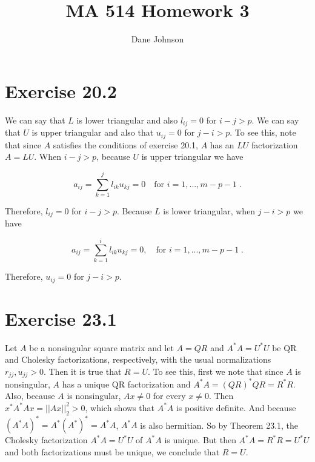 \documentclass[11pt]{article}
\title{MA 514 Homework 3}
\author{Dane Johnson}
\begin{document}
\maketitle

\section*{Exercise 20.2}

We can say that $L$ is lower triangular and also $l_{ij} = 0$ for $i-j > p$. We can say that $U$ is upper triangular and also that $u_{ij} = 0$ for $j-i > p$. To see this, note that since $A$ satisfies the conditions of exercise 20.1, $A$ has an $LU$ factorization $A = LU$. When $i-j>p$, because $U$ is upper triangular we have

$$a_{ij} = \sum_{k=1}^j l_{ik}u_{kj}  = 0 \quad \text{for } i = 1,...,m-p-1 \;.$$

Therefore, $l_{ij} = 0$ for $i-j > p$. Because $L$ is lower triangular, when $j-i > p$ we have

$$a_{ij} = \sum_{k=1}^i l_{ik}u_{kj} = 0, \quad \text{for } i = 1,...,m-p-1 \;.$$

Therefore, $u_{ij} = 0$ for $j-i > p$.

\section*{Exercise 23.1}

Let $A$ be a nonsingular square matrix and let $A = QR$ and $A^*A = U^*U$ be QR and Cholesky factorizations, respectively, with the usual normalizations $r_{jj}, u_{jj} > 0$. Then it is true that $R = U$. To see this, first we note that since $A$ is nonsingular, $A$ has a unique QR factorization and $A^*A = (QR)^*QR = R^*R$. Also, because $A$ is nonsingular, $Ax \neq 0$ for every $x \neq 0$. Then $x^*A^*Ax = ||Ax||_2^2 > 0$, which shows that $A^*A$ is positive definite. And because $(A^*A)^* = A^*(A^*)^* = A^*A$, $A^*A$ is also hermitian. So by Theorem 23.1, the Cholesky factorization $A^*A = U^*U$ of $A^*A$ is unique. But then $A^*A = R^*R = U^*U$ and both factorizations must be unique, we conclude that $R = U$.
\end{document}
